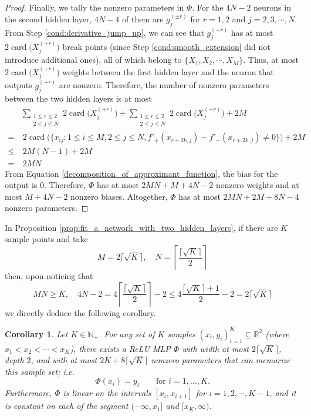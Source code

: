 \documentclass{article}
\numberwithin{equation}{section}
\newtheorem{corollary}{Corollary}[section]
\theoremstyle{definition}
\begin{document}
\begin{proof}
Finally, we tally the nonzero parameters in $\Phi$. 
For the $4N-2$ neurons in the second hidden layer, $4N-4$ of them are $g_j^{(\pm r)}$ for $r=1,2$ and $j=2,3,\cdots,N$. From Step \ref{cond:derivative_jump_up}, we can see that $g_j^{(+r)}$ has at most $2\operatorname{card} \big( X_j^{(+r)} \big)$ break points (since Step \ref{cond:smooth_extension} did not introduce additional ones), all of which belong to $\{X_1,X_2,\cdots,X_M\}$. Thus, at most $2\operatorname{card} \big( X_j^{(+r)} \big)$ weights between the first hidden layer and the neuron that outputs $g_j^{(+r)}$ are nonzero. Therefore, the number of nonzero parameters between the two hidden layers is at most 
\begin{align*}
    &\sum_{\substack{1\le r\le 2 \\ 2\le j\le N}} 
    2\operatorname{card} \big( X_j^{(+r)} \big)
    +
    \sum_{\substack{1\le r\le 2 \\ 2\le j\le N}} 
    2\operatorname{card} \big( X_j^{(-r)} \big)
    +
    2M
    \\
    =
    & \ 2 \operatorname{card}
    \big( \big\{
        x_{ij}:
        1\le i\le M,
        2\le j\le N,
        f'_+(x_{r+2k,j}) - f'_-(x_{r+2k,j}) \ne 0
    \big\} \big)
    +
    2M
    \\
    \le
    & \ 2M(N-1) + 2M
    \\
    =
    & \ 2MN
\end{align*}
From Equation \ref{decomposition_of_approximant_function}, the bias for the output is $0$. Therefore, $\Phi$ has at most $2MN+M+4N-2$ nonzero weights and at most $M+4N-2$ nonzero biases. Altogether, $\Phi$ has at most $2MN+2M+8N-4$ nonzero parameters. 
\end{proof}


In Proposition \ref{prop:fit_a_network_with_two_hidden_layers}, if there are $K$ sample points and take 
\[
    M=2\lceil \sqrt{K} \rceil, 
    \quad
    N=\left\lceil \frac{\lceil \sqrt{K} \rceil}{2} \right\rceil
\]
then, upon noticing that
\[
    MN \ge K,
    \quad
    4N-2 
    = 
    4
    \left\lceil
        \frac{\lceil \sqrt{K} \rceil}{2}
    \right\rceil
    -2
    \le
    4
    \frac{\lceil \sqrt{K} \rceil + 1}{2}
    -2
    =
    2\lceil \sqrt{K} \rceil
\]
we directly deduce the following corollary.


\begin{corollary}
\label{cor:fit_a_network_with_two_hidden_layers}
Let $K\in\mathbb{N}_+$. For any set of $K$ samples $(x_{i},y_{i})_{i=1}^{K}\subseteq\mathbb{R}^2$ (where $x_1<x_2<\cdots<x_{K}$), there exists a ReLU MLP $\Phi$ with width at most $2\lceil \sqrt{K} \rceil$, depth $2$, and with at most $2K+8\lceil \sqrt{K} \rceil$ nonzero parameters that can memorize this sample set; i.e. 
\[
    \Phi(x_i)=y_i \qquad \mbox{for } i=1,\dots,K
.
\]
Furthermore, $\Phi$ is linear on the intervals $[x_i,x_{i+1}]$ for $i=1,2,\cdots,K-1$, and it is constant on each of the segment $(-\infty,x_1]$ and $[x_{K},\infty)$.
\end{corollary}
\end{document}
